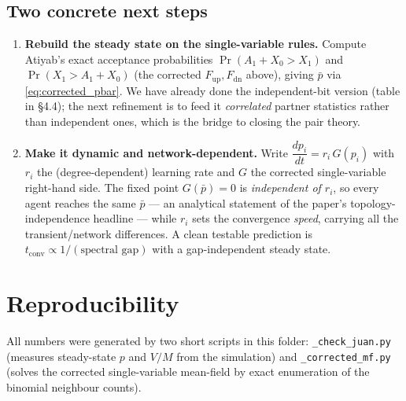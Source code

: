 \documentclass[11pt]{article}
\begin{document}
\subsection{Two concrete next steps}
\begin{enumerate}[nosep]
  \item \textbf{Rebuild the steady state on the single-variable rules.} Compute Atiyab's exact
        acceptance probabilities $\Pr(A_1+X_0>X_1)$ and $\Pr(X_1>A_1+X_0)$ (the corrected
        $F_{\text{up}},F_{\text{dn}}$ above), giving $\bar p$ via \eqref{eq:corrected_pbar}. We have
        already done the independent-bit version (table in \S4.4); the next refinement is to feed it
        \emph{correlated} partner statistics rather than independent ones, which is the bridge to
        closing the pair theory.
  \item \textbf{Make it dynamic and network-dependent.} Write $\dfrac{dp_i}{dt}=r_i\,G(p_i)$ with
        $r_i$ the (degree-dependent) learning rate and $G$ the corrected single-variable
        right-hand side. The fixed point $G(\bar p)=0$ is \emph{independent of $r_i$}, so every
        agent reaches the same $\bar p$ --- an analytical statement of the paper's
        topology-independence headline --- while $r_i$ sets the convergence \emph{speed}, carrying
        all the transient/network differences. A clean testable prediction is
        $t_{\text{conv}}\propto1/(\text{spectral gap})$ with a gap-independent steady state.
\end{enumerate}

\appendix
\section{Reproducibility}
All numbers were generated by two short scripts in this folder:
\texttt{\_check\_juan.py} (measures steady-state $p$ and $V/M$ from the simulation) and
\texttt{\_corrected\_mf.py} (solves the corrected single-variable mean-field by exact enumeration
of the binomial neighbour counts).
\end{document}
